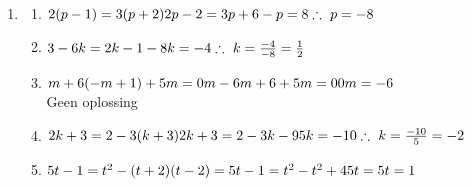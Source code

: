  \begin{eocsolutions}{}{
\begin{enumerate}[itemsep=7pt, label=\textbf{\arabic*}. ] 

 \item 
\begin{multicols}{2}
\begin{enumerate}[itemsep=6pt,label=\textbf{(\alph*)}]
\item $2(p-1) = 3(p+2)\\
2p-2=3p+6\\
-p=8\\
\therefore~p=-8\\$
\item $3-6k = 2k-1\\
-8k=-4\\
\therefore~k=\frac{-4}{-8} =\frac{1}{2}\\$

\item $m + 6(-m+1) + 5m = 0\\
m-6m+6+5m=0\\
0m=-6$\\
Geen oplossing
\item $2k + 3 = 2-3(k+3)
2k+3=2-3k-9\\
5k=-10\\
\therefore~k=\frac{-10}{5} = -2\\$
\item $5t-1=t^{2}-(t+2)(t-2)\\ = 5t-1=t^2-t^2+4\\ 5t=5\\ t=1$


\end{enumerate}
\end{multicols}
\end{enumerate}}
\end{eocsolutions}
